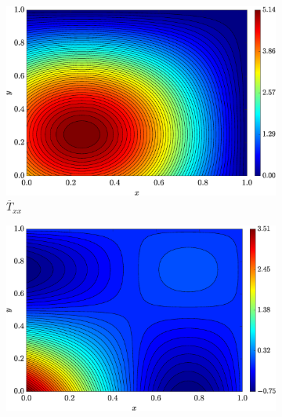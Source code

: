 \begin{figure}[H]
        \centering
	\caption{Mapas de cores das soluções manufaturadas no regime de estado estacionário para os tensores, considerando $a = 0.05$ em $t = 0.1$}
        \label{fig_T_xxxyyy_sol_num_case1streamline2}
	\begin{subfigure}[b]{.47\textwidth}
            \includegraphics[width=\textwidth]{figures/Case12/UCM/Solutions/Exact_Map_NormErr_2nd_Betann_0.1_Re_1_Wi_1_epsilon_0_xi_0_alphaG_0_Dt_1e-06_at_0.05_tipsim_1_MMS_12_Txx.eps}
            \caption{$\overline{T}_{xx}$}
            \label{fig_solexatxxstreamlineCase1}
        \end{subfigure}
        \begin{subfigure}[b]{.47\textwidth}
            \includegraphics[width=\textwidth]{figures/Case12/UCM/Solutions/Exact_Map_NormErr_2nd_Betann_0.1_Re_1_Wi_1_epsilon_0_xi_0_alphaG_0_Dt_1e-06_at_0.05_tipsim_1_MMS_12_Txy.eps}

\end{subfigure}
\end{figure}
